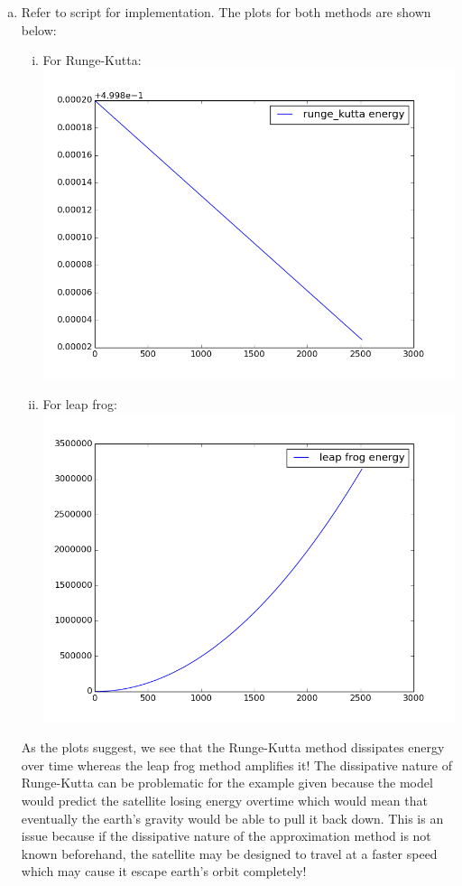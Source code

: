 \documentclass[a4paper, 12pt]{article}
\begin{document}
\begin{enumerate}[(a)]
	\item Refer to script for implementation. The plots for both methods are shown below:\\
	\begin{enumerate}[(i)]
	  	\item For Runge-Kutta: \\
	  		\includegraphics[scale=.5]{fig1_3.png}\hfill
	  	\item For leap frog: \\
	  		\includegraphics[scale=.5]{fig1_4.png}\hfill
	\end{enumerate} 
	As the plots suggest, we see that the Runge-Kutta method dissipates energy over time whereas the leap frog method amplifies it! The dissipative nature of Runge-Kutta can be problematic for the example given because the model would predict the satellite losing energy overtime which would mean that eventually the earth's gravity would be able to pull it back down. This is an issue because if the dissipative nature of the approximation method is not known beforehand, the satellite may be designed to travel at a faster speed which may cause it escape earth's orbit completely!
\end{enumerate}
\newpage
\end{document}
